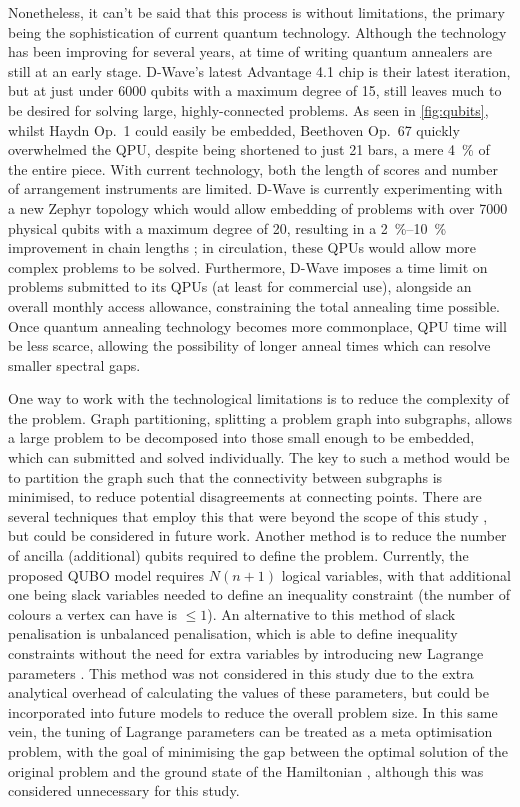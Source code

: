 \documentclass[12pt]{article}
\theoremstyle{definition}
\begin{document}
Nonetheless, it can't be said that this process is without limitations, the primary being the sophistication of current quantum technology. Although the technology has been improving for several years, at time of writing quantum annealers are still at an early stage. D-Wave's latest Advantage 4.1 chip is their latest iteration, but at just under \num{6000} qubits with a maximum degree of \num{15}, still leaves much to be desired for solving large, highly-connected problems. As seen in \cref{fig:qubits}, whilst Haydn Op.\ 1 could easily be embedded, Beethoven Op.\ 67 quickly overwhelmed the QPU, despite being shortened to just \num{21} bars, a mere \qty{4}{\%} of the entire piece. With current technology, both the length of scores and number of arrangement instruments are limited. D-Wave is currently experimenting with a new Zephyr topology which would allow embedding of problems with over \num{7000} physical qubits with a maximum degree of \num{20}, resulting in a \qtyrange{2}{10}{\%} improvement in chain lengths \cite{dwave_zephyr}; in circulation, these QPUs would allow more complex problems to be solved.
Furthermore, D-Wave imposes a time limit on problems submitted to its QPUs (at least for commercial use), alongside an overall monthly access allowance, constraining the total annealing time possible. Once quantum annealing technology becomes more commonplace, QPU time will be less scarce, allowing the possibility of longer anneal times which can resolve smaller spectral gaps.

One way to work with the technological limitations is to reduce the complexity of the problem. Graph partitioning, splitting a problem graph into subgraphs, allows a large problem to be decomposed into those small enough to be embedded, which can submitted and solved individually. The key to such a method would be to partition the graph such that the connectivity between subgraphs is minimised, to reduce potential disagreements at connecting points. There are several techniques that employ this that were beyond the scope of this study \cite{dwave_decomposing}, but could be considered in future work.
Another method is to reduce the number of ancilla (additional) qubits required to define the problem. Currently, the proposed QUBO model requires $N(n+1)$ logical variables, with that additional one being slack variables needed to define an inequality constraint (the number of colours a vertex can have is $\le1$). An alternative to this method of slack penalisation is unbalanced penalisation, which is able to define inequality constraints without the need for extra variables by introducing new Lagrange parameters \cite{montanez-barrera_unbalanced_2024}. This method was not considered in this study due to the extra analytical overhead of calculating the values of these parameters, but could be incorporated into future models to reduce the overall problem size. In this same vein, the tuning of Lagrange parameters can be treated as a meta optimisation problem, with the goal of minimising the gap between the optimal solution of the original problem and the ground state of the Hamiltonian \cite{montanez-barrera_unbalanced_2024}, although this was considered unnecessary for this study.
\end{document}
